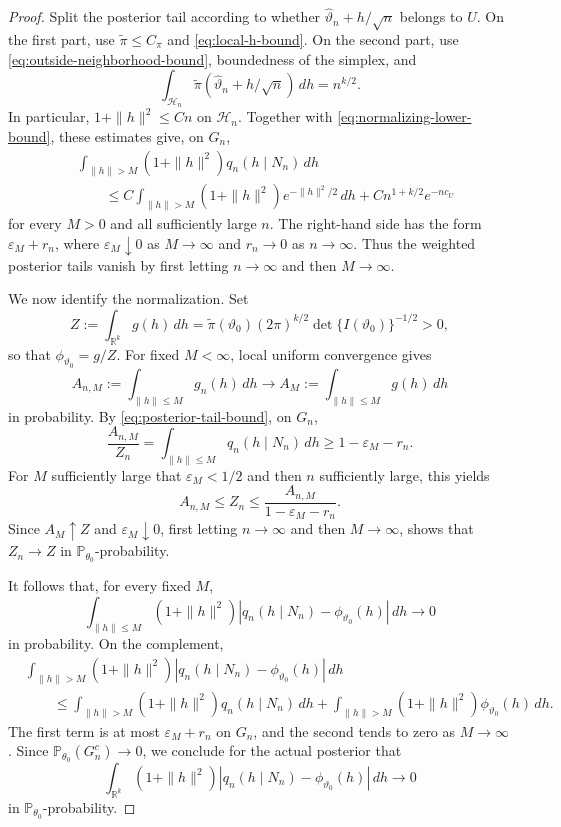 \documentclass[10pt,a4paper]{amsart}
\theoremstyle{named}
\theoremstyle{named1}
\theoremstyle{plain}
\theoremstyle{remark}
\begin{document}
\begin{proof}
Split the posterior tail according to whether
$\widehat\vartheta_n+h/\sqrt n$ belongs to $U$. On the first part,
use $\widetilde\pi\leq C_\pi$ and \eqref{eq:local-h-bound}. On the
second part, use \eqref{eq:outside-neighborhood-bound}, boundedness of
the simplex, and
\[
    \int_{\mathcal H_n}
    \widetilde\pi(\widehat\vartheta_n+h/\sqrt n)\,dh
    =n^{k/2}.
\]
In particular, $1+\|h\|^2\leq Cn$ on $\mathcal H_n$. Together with
\eqref{eq:normalizing-lower-bound}, these estimates give, on $G_n$,
\begin{equation}
\begin{aligned}
    &\int_{\|h\|>M}(1+\|h\|^2)q_n(h\mid N_n)\,dh\\
    &\qquad\leq
    C\int_{\|h\|>M}(1+\|h\|^2)e^{-\|h\|^2/2}\,dh
    +Cn^{1+k/2}e^{-nc_U}
\end{aligned}
    \label{eq:posterior-tail-bound}
\end{equation}
for every $M>0$ and all sufficiently large $n$.
 The right-hand side
has the form $\varepsilon_M+r_n$, where $\varepsilon_M\downarrow0$
as $M\to\infty$ and $r_n\to0$ as $n\to\infty$. Thus the weighted
posterior tails vanish by first letting $n\to\infty$ and then
$M\to\infty$.

We now identify the normalization. Set
\[
    Z:=\int_{\mathbb R^k}g(h)\,dh
      =\widetilde\pi(\vartheta_0)(2\pi)^{k/2}
        \det\{I(\vartheta_0)\}^{-1/2}>0,
\]
so that $\phi_{\vartheta_0}=g/Z$. For fixed $M<\infty$, local uniform
convergence gives
\[
    A_{n,M}:=\int_{\|h\|\leq M}g_n(h)\,dh
    \rightarrow
    A_M:=\int_{\|h\|\leq M}g(h)\,dh
\]
in probability. By \eqref{eq:posterior-tail-bound}, on $G_n$,
\[
    \frac{A_{n,M}}{Z_n}
    =\int_{\|h\|\leq M}q_n(h\mid N_n)\,dh
    \geq1-\varepsilon_M-r_n.
\]
For $M$ sufficiently large that $\varepsilon_M<1/2$ and then $n$
sufficiently large, this yields
\[
    A_{n,M}\leq Z_n\leq\frac{A_{n,M}}{1-\varepsilon_M-r_n}.
\]
Since $A_M\uparrow Z$ and $\varepsilon_M\downarrow0$,
first letting $n\to\infty$ and then  $M\to\infty$, shows that
$Z_n\to Z$ in $\mathbb P_{\theta_0}$-probability.

It follows that, for every fixed $M$,
\[
    \int_{\|h\|\leq M}(1+\|h\|^2)
    |q_n(h\mid N_n)-\phi_{\vartheta_0}(h)|\,dh
    \rightarrow0
\]
in probability. On the complement,
\[
\begin{aligned}
    &\int_{\|h\|>M}(1+\|h\|^2)
      |q_n(h\mid N_n)-\phi_{\vartheta_0}(h)|\,dh\\
    &\qquad\leq
      \int_{\|h\|>M}(1+\|h\|^2)q_n(h\mid N_n)\,dh
      +\int_{\|h\|>M}(1+\|h\|^2)\phi_{\vartheta_0}(h)\,dh.
\end{aligned}
\]
The first term is at most $\varepsilon_M+r_n$ on $G_n$, and the second
tends to zero as $M\to\infty$. Since
$\mathbb P_{\theta_0}(G_n^c)\to0$, we conclude for the actual posterior
that
\begin{equation}
    \int_{\mathbb R^k}(1+\|h\|^2)
    |q_n(h\mid N_n)-\phi_{\vartheta_0}(h)|\,dh
    \rightarrow0
    \label{posterior-moment-conv}
\end{equation}
in $\mathbb P_{\theta_0}$-probability.


\end{proof}
\end{document}
